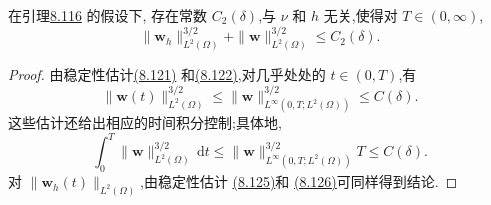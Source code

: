 \begin{lemma}[式(8.134)右端其余各项的时间正则性]
\label{lem:smagorinsky-error-other-terms-integrability}
在引理\hyperref[lem:smagorinsky-error-bracket-integrability]{8.116} 的假设下,
存在常数 $C_2(\delta)$,与 $\nu$ 和 $h$ 无关,使得对 $T\in(0,\infty)$,
\[
\|\bm{w}_h\|_{L^2(\Omega)}^{3/2}
 +\|\bm{w}\|_{L^2(\Omega)}^{3/2}\le C_2(\delta).
\]
\begin{proof}
由稳定性估计\hyperref[eq:smagorinsky-uniform-stability]{(8.121)}
和\hyperref[eq:smagorinsky-weighted-stability]{(8.122)},对几乎处处的
$t\in(0,T)$,有
\[
\|\bm{w}(t)\|_{L^2(\Omega)}^{3/2}
\le \|\bm{w}\|_{L^\infty(0,T;L^2(\Omega))}^{3/2}
\le C(\delta).
\]
这些估计还给出相应的时间积分控制;具体地,
\[
\int_0^T\|\bm{w}\|_{L^2(\Omega)}^{3/2}\,\mathrm{d}t
\le \|\bm{w}\|_{L^\infty(0,T;L^2(\Omega))}^{3/2}T
\le C(\delta).
\]
对 $\|\bm{w}_h(t)\|_{L^2(\Omega)}$,由稳定性估计
\hyperref[eq:smagorinsky-fem-uniform-stability]{(8.125)}和
\hyperref[eq:smagorinsky-fem-weighted-stability]{(8.126)}可同样得到结论.
\end{proof}
\end{lemma}

